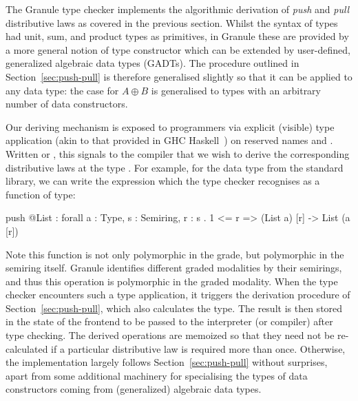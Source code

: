  The Granule type checker implements the algorithmic derivation of \emph{push}
 and \emph{pull} distributive laws as covered in the previous section. Whilst the
 syntax of \grminip{} types had unit, sum, and product types as primitives, in
 Granule these are provided by a more general notion of type constructor which
 can be extended by user-defined, generalized algebraic data types (GADTs). The
 procedure outlined in Section~\ref{sec:push-pull} is therefore generalised
 slightly so that it can be applied to any data type: the case for $A \oplus B$
 is generalised to types with an arbitrary number of data constructors.
 
 Our deriving mechanism is exposed to programmers via explicit (visible) type
 application (akin to that provided in GHC Haskell~\cite{eisenberg2016visible})
 on reserved names  and . Written  or
 , this signals to the compiler that we wish to derive the
 corresponding distributive laws at the type . For example, for the
  data type from the standard library, we can write
 the expression  which the type checker recognises as a
 function of type:
 \begin{granule}
 push @List : forall {a : Type, s : Semiring, r : s} . {1 <= r} => (List a) [r] -> List (a [r])
 \end{granule}
 Note this function is not only polymorphic in the grade, but polymorphic in the
 semiring itself. Granule identifies different graded modalities by
 their semirings, and thus this operation is polymorphic in the graded
 modality. When the type checker encounters such a type application, it
 triggers the derivation procedure of Section~\ref{sec:push-pull},
 which also calculates the type. The result is then stored in the state
 of the frontend to be passed to the interpreter (or compiler) after
 type checking. The derived operations are memoized so that they need not be re-calculated if a particular distributive law is required more than once.
 Otherwise, the implementation largely follows
 Section~\ref{sec:push-pull} without surprises,
 apart from some additional machinery for specialising the types
 of data constructors coming from (generalized) algebraic data types.
 
